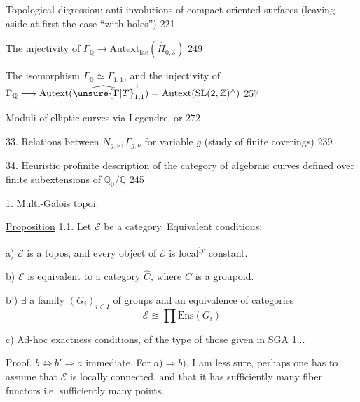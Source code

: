  Topological digression: anti-involutions of compact
oriented surfaces (leaving aside at first the case ``with holes'')
\hfill 221

 The injectivity of
\(\Gamma_{\mathbb Q}\longrightarrow
\mathrm{Autext}_{\mathrm{lac}}(\widehat{\Pi}_{0,3})\)
\hfill 249

 The isomorphism
\(\Gamma_{\mathbb Q}\simeq\Gamma_{1,1}\),
and the injectivity of
\(\Gamma_{\mathbb Q}\longrightarrow
\mathrm{Autext}(\widehat{\unsure{\Gamma|T}}_{1,1}^{+})
=\mathrm{Autext}(\mathrm{SL}(2,\mathbb Z)^{\wedge})\)
\hfill 257

 Moduli of elliptic curves via Legendre, or
 \hfill 272

33. Relations between \(N_{g,\nu},\Gamma_{g,\nu}\) for variable \(g\)
(study of finite coverings) \hfill 239

34. Heuristic profinite description of the category of algebraic curves
defined over finite 
subextensions of \(\mathbb Q_0/\mathbb Q\)
\hfill 245




1. Multi-Galois topoi.

\uline{Proposition} 1.1. Let \(\mathcal E\) be a category.
Equivalent conditions:

a) \(\mathcal E\) is a topos, and every object of \(\mathcal E\)
is local\textsuperscript{ly} constant.

b) \(\mathcal E\) is equivalent to a category \(\widehat C\),
where \(C\) is a groupoid.


b') \(\exists\) a family \((G_i)_{i\in I}\) of groups
and an equivalence of categories
\[
\mathcal E\approxeq\prod\mathrm{Ens}(G_i)
\]

c) Ad-hoc exactness conditions, of the type of those given in SGA 1...

Proof. \(b\Longleftrightarrow b'\Longrightarrow a\) immediate.
For \(a)\Longrightarrow b)\), I am less sure, perhaps one has to
assume that \(\mathcal E\) is locally connected, and that it has sufficiently
many fiber functors i.e. sufficiently many points.


